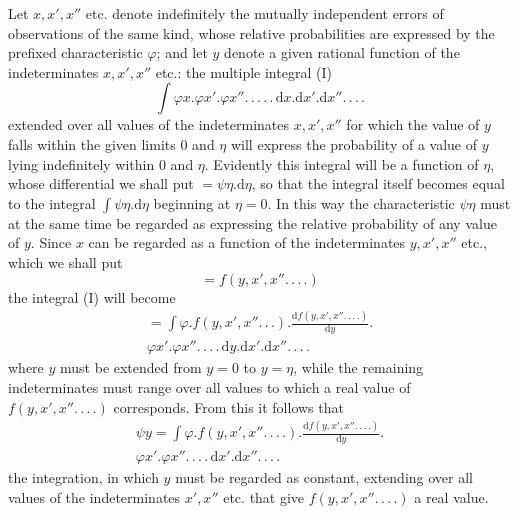 Let \(x,x',x''\) etc. denote indefinitely the mutually independent errors of observations of the same kind, whose relative probabilities are expressed by the prefixed characteristic \(\varphi\); and let \(y\) denote a given rational function of the indeterminates \(x,x',x''\) etc.: the multiple integral (I)
\[
\int\varphi x.\varphi x'.\varphi x''\mathord{.}\,\mathord{.}\,\mathord{.}\,\mathord{.}\,\mathord{.}\,\mathrm{d}x.\mathrm{d}x'.\mathrm{d}x''\mathord{.}\,\mathord{.}\,\mathord{.}\,\mathord{.}
\]
extended over all values of the indeterminates \(x,x',x''\) for which the value of \(y\) falls within the given limits \(0\) and \(\eta\) will express the probability of a value of \(y\) lying indefinitely within \(0\) and \(\eta\). Evidently this integral will be a function of \(\eta\), whose differential we shall put \(=\psi\eta.\mathrm{d}\eta\), so that the integral itself becomes equal to the integral \(\int\psi\eta.\mathrm{d}\eta\) beginning at \(\eta=0\). In this way the characteristic \(\psi\eta\) must at the same time be regarded as expressing the relative probability of any value of \(y\). Since \(x\) can be regarded as a function of the indeterminates \(y,x',x''\) etc., which we shall put
\[
=f(y,x',x''\mathord{.}\,\mathord{.}\,\mathord{.}\,\mathord{.})
\]
the integral (I) will become
\[
\begin{aligned}
=\int\varphi.f(y,x',x''\mathord{.}\,\mathord{.}\,\mathord{.}).\frac{\mathrm{d}f(y,x',x''\mathord{.}\,\mathord{.}\,\mathord{.}\,\mathord{.})}{\mathrm{d}y}.{}\\
\varphi x'.\varphi x''\mathord{.}\,\mathord{.}\,\mathord{.}\,\mathord{.}\,\mathrm{d}y.\mathrm{d}x'.\mathrm{d}x''\mathord{.}\,\mathord{.}\,\mathord{.}\,\mathord{.}
\end{aligned}
\]
where \(y\) must be extended from \(y=0\) to \(y=\eta\), while the remaining indeterminates must range over all values to which a real value of \(f(y,x',x''\mathord{.}\,\mathord{.}\,\mathord{.}\,\mathord{.})\) corresponds. From this it follows that
\[
\begin{aligned}
\psi y=\int\varphi.f(y,x',x''\mathord{.}\,\mathord{.}\,\mathord{.}\,\mathord{.}).\frac{\mathrm{d}f(y,x',x''\mathord{.}\,\mathord{.}\,\mathord{.}\,\mathord{.})}{\mathrm{d}y}.{}\\
\varphi x'.\varphi x''\mathord{.}\,\mathord{.}\,\mathord{.}\,\mathord{.}\,\mathrm{d}x'.\mathrm{d}x''\mathord{.}\,\mathord{.}\,\mathord{.}\,\mathord{.}
\end{aligned}
\]
the integration, in which \(y\) must be regarded as constant, extending over all values of the indeterminates \(x',x''\) etc. that give \(f(y,x',x''\mathord{.}\,\mathord{.}\,\mathord{.}\,\mathord{.})\) a real value.

